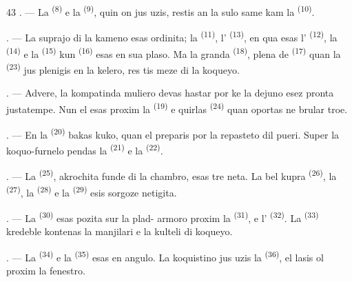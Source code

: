 \begin{VUpage}[45]{43}
. --- La  \textsuperscript{(8)} e la  \textsuperscript{(9)},\nl
quin on jus uzis, restis an la sulo same kam\nl
la  \textsuperscript{(10)}.

. --- La suprajo di la kameno esas ordinita;\nl
la  \textsuperscript{(11)}, l' \textsuperscript{(13)}, en qua esas\nl
l' \textsuperscript{(12)}, la  \textsuperscript{(14)} e la  \textsuperscript{(15)}\nl
kun  \textsuperscript{(16)} esas en sua plaso. Ma la granda\nl
{} \textsuperscript{(18)}, plena de  \textsuperscript{(17)} quan\nl
la  \textsuperscript{(23)} jus plenigis en la kelero, res\cc
tis meze di la koqueyo.

. --- Advere, la kompatinda muliero devas\nl
hastar por ke la dejuno esez pronta justatempe.\nl
Nun el esas proxim la  \textsuperscript{(19)} e\nl
quirlas  \textsuperscript{(24)} quan oportas ne brular troe.

. --- En la  \textsuperscript{(20)} bakas kuko, quan el\nl
preparis por la repasteto dil pueri. Super la\nl
koquo-furnelo pendas la  \textsuperscript{(21)} e la\nl
{} \textsuperscript{(22)}.

\VUsaut{4.0mm}
\VUsaut{3.0mm}

. --- La  \textsuperscript{(25)}, akrochita funde di la\nl
chambro, esas tre neta. La bel kupra \cc
{} \textsuperscript{(26)}, la  \textsuperscript{(27)}, la  \textsuperscript{(28)} e la\nl
{} \textsuperscript{(29)} esis sorgoze netigita.

. --- La  \textsuperscript{(30)} esas pozita sur la plad-\nl
armoro proxim la  \textsuperscript{(31)}, e l'\cc
{} \textsuperscript{(32)}. La  \textsuperscript{(33)} kredeble kontenas la\nl
manjilari e la kulteli di koqueyo.

. --- La  \textsuperscript{(34)} e la  \textsuperscript{(35)} esas\nl
en angulo. La koquistino jus uzis la \cc
{} \textsuperscript{(36)}, el lasis ol proxim la fenestro.
\end{VUpage}

